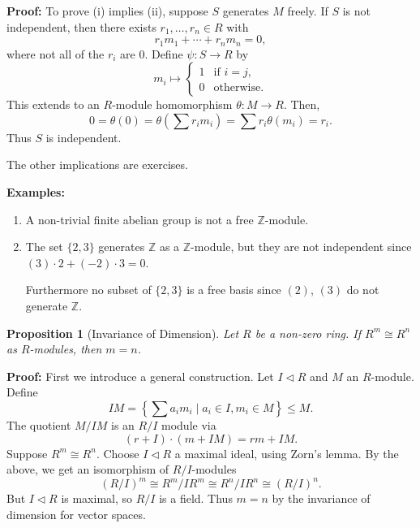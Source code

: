 \documentclass[12pt]{article}
\newtheorem{proposition}{Proposition}[section]
\theoremstyle{definition}
\theoremstyle{remark}
\begin{document}
\begin{adjustbox}{minipage = \columnwidth - 25.5pt, margin=1em, frame=1pt, margin=0em}
	\textbf{Proof:} To prove (i) implies (ii), suppose $S$ generates $M$ freely. If $S$ is not independent, then there exists $r_1, \ldots, r_n \in R$ with
	\[
	r_1 m_1 + \cdots + r_n m_n = 0
	,\]
	where not all of the $r_i$ are 0. Define $\psi : S \to R$ by
	\[
	m_i \mapsto
	\begin{cases}
		1 & \text{if } i = j, \\
		0 & \text{otherwise}.
	\end{cases}
	\]
	This extends to an $R$-module homomorphism $\theta : M \to R$. Then,
	\[
		0 = \theta(0) = \theta\left( \sum r_i m_i\right) = \sum r_i \theta(m_i) = r_i
	.\]
	Thus $S$ is independent.

	The other implications are exercises.
\end{adjustbox}

\textbf{Examples:} 

\begin{enumerate}[label = (\roman*)]
	\item A non-trivial finite abelian group is not a free $\mathbb{Z}$-module.
	\item The set $\{2, 3\}$ generates $\mathbb{Z}$ as a $\mathbb{Z}$-module, but they are not independent since $(3) \cdot 2 + (-2) \cdot 3 = 0$.

		Furthermore no subset of $\{2, 3\}$ is a free basis since $(2)$, $(3)$ do not generate $\mathbb{Z}$.
\end{enumerate}

\begin{proposition}[Invariance of Dimension]
	Let $R$ be a non-zero ring. If $R^{m} \cong R^{n}$ as $R$-modules, then $m = n$.
\end{proposition}

\begin{adjustbox}{minipage = \columnwidth - 25.5pt, margin=1em, frame=1pt, margin=0em}
\textbf{Proof:} First we introduce a general construction. Let $I \lhd R$ and $M$ an $R$-module. Define
\[
	IM = \left\{ \sum a_i m_i \mid a_i \in I, m_i \in M \right\} \leq M
.\]
The quotient $M / IM$ is an $R/I$ module via
\[
	(r + I) \cdot (m + IM) = rm + IM
.\]
Suppose $R^{m} \cong R^{n}$. Choose $I \lhd R$ a maximal ideal, using Zorn's lemma. By the above, we get an isomorphism of $R/I$-modules
\[
	(R/I)^{m} \cong R^{m} / IR^{m} \cong R^{n} / IR^{n} \cong (R/I)^{n}
.\]
But $I \lhd R$ is maximal, so $R/I$ is a field. Thus $m = n$ by the invariance of dimension for vector spaces.
\end{adjustbox}
\end{document}
